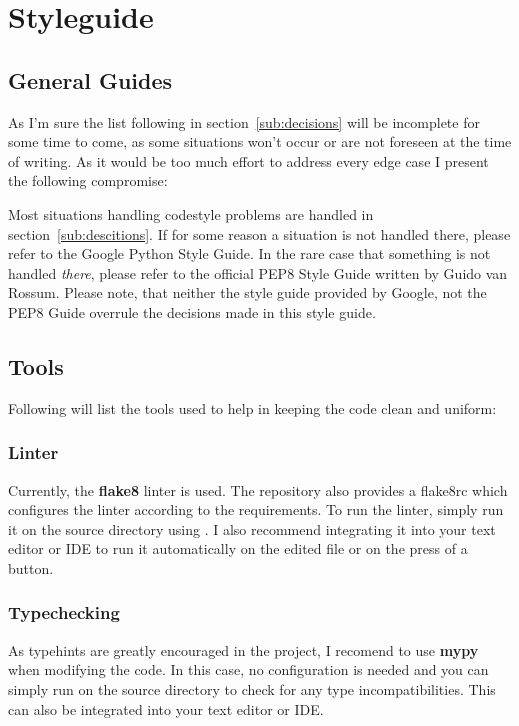 \section{Styleguide}

\subsection{General Guides}
As I'm sure the list following in section~\ref{sub:decisions} will be
incomplete for some time to come, as some situations won't occur or are not
foreseen at the time of writing. As it would be too much effort to address
every edge case I present the following compromise:

Most situations handling codestyle problems are handled in
section~\ref{sub:descitions}. If for some reason a situation is not handled
there, please refer to the Google Python Style Guide. 
In the rare case that something is not handled \emph{there}, please refer to
the official PEP8 Style Guide written by Guido van Rossum.  Please note, that
neither the style guide provided by Google, not the PEP8 Guide overrule the
decisions made in this style guide.

\subsection{Tools}
Following will list the tools used to help in keeping the code clean
and uniform:

\subsubsection{Linter}
Currently, the \textbf{flake8} linter is used. The repository also provides a
flake8rc which configures the linter according to the requirements. To run the
linter, simply run it on the source directory using . I also
recommend integrating it into your text editor or IDE to run it automatically
on the edited file or on the press of a button. 

\subsubsection{Typechecking}
As typehints are greatly encouraged in the project, I recomend to
use \textbf{mypy} when modifying the code. In this case, no configuration is
needed and you can simply run  on the source directory to check
for any type incompatibilities. This can also be integrated into your
text editor or IDE.

